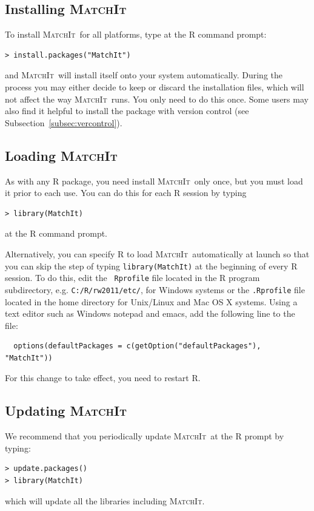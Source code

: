 \documentclass[oneside,letterpaper,titlepage]{article}
\newcommand{\MatchIt}{\textsc{MatchIt}}
\begin{document}
\subsection{Installing \MatchIt}
\label{subsec:install}

To install \MatchIt\ for all platforms, type at the R command prompt:
\begin{verbatim}
> install.packages("MatchIt")
\end{verbatim}
and \MatchIt\ will install itself onto your system automatically.
During the process you may either decide to keep or discard the
installation files, which will not affect the way \MatchIt\ runs.  You
only need to do this once.  Some users may also find it helpful to
install the package with version control (see
Subsection~\ref{subsec:vercontrol}).

\subsection{Loading \MatchIt}
\label{subsec:load}

As with any R package, you need install \MatchIt\ only once, but you
must load it prior to each use.  You can do this for each R session by
typing
\begin{verbatim}
> library(MatchIt) 
\end{verbatim}
at the R command prompt.  

Alternatively, you can specify R to load \MatchIt\ automatically at
launch so that you can skip the step of typing {\tt library(MatchIt)}
at the beginning of every R session.  To do this, edit the {\tt
  Rprofile} file located in the R program subdirectory, e.g.
\texttt{C:/R/rw2011/etc/}, for Windows systems or the {\tt .Rprofile}
file located in the home directory for Unix/Linux and Mac OS X
systems.  Using a text editor such as Windows notepad and emacs, add
the following line to the file:
\begin{verbatim}
  options(defaultPackages = c(getOption("defaultPackages"), "MatchIt"))
\end{verbatim}
For this change to take effect, you need to restart R.

\subsection{Updating \MatchIt}

We recommend that you periodically update \MatchIt\ at the R prompt by typing:
\begin{verbatim}
> update.packages()
> library(MatchIt) 
\end{verbatim}
which will update all the libraries including \MatchIt.
\end{document}

